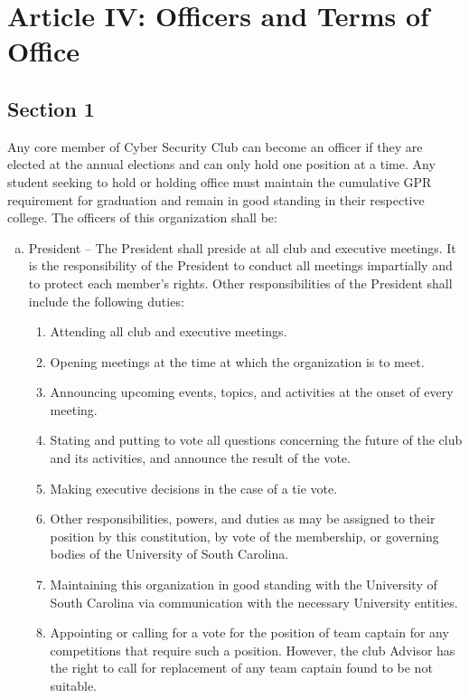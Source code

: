 \documentclass[10pt]{article}
\begin{document}
\section*{Article IV: Officers and Terms of Office}
\subsection*{Section 1}
Any core member of Cyber Security Club can become an officer if they are elected at the annual
elections and can only hold one position at a time. Any student seeking to hold or holding office
must maintain the cumulative GPR requirement for graduation and remain in good standing
in their respective college. The officers of this organization shall be:
\begin{enumerate}[(a)]
    \item President -- The President shall preside at all club and executive meetings. It is the responsibility of the President to conduct all meetings impartially and to protect each member’s rights. Other responsibilities of the President shall include the following duties:
    \begin{enumerate}[1.]
        \item Attending all club and executive meetings.
        \item Opening meetings at the time at which the organization is to meet.
        \item Announcing upcoming events, topics, and activities at the onset of every meeting.
        \item Stating and putting to vote all questions concerning the future of the club and its activities, and announce the result of the vote.
        \item Making executive decisions in the case of a tie vote.
        \item Other responsibilities, powers, and duties as may be assigned to their position by this constitution, by vote of the membership, or governing bodies of the University of South Carolina.
        \item Maintaining this organization in good standing with the University of South Carolina via communication with the necessary University entities.
        \item Appointing or calling for a vote for the position of team captain for any competitions that require such a position. However, the club Advisor has the right to call for replacement of any team captain found to be not suitable.

\end{enumerate}
\end{enumerate}
\end{document}
